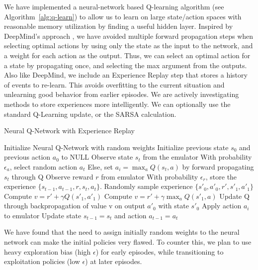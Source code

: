 \documentclass{article}
\begin{document}
We have implemented a neural-network based Q-learning algorithm (see Algorithm~\ref{alg:q-learn}) to allow us to learn on large state/action spaces with reasonable memory utilization by finding a useful hidden layer. Inspired by DeepMind's approach \cite{Mnih13}, we have avoided multiple forward propagation steps when selecting optimal actions by using only the state as the input to the network, and a weight for each action as the output. Thus, we can select an optimal action for a state by propagating once, and selecting the max argument from the outputs. Also like DeepMind, we include an Experience Replay step that stores a history of events to re-learn. This avoids overfitting to the current situation and unlearning good behavior from earlier episodes. We are actively investigating methods to store experiences more intelligently. We can optionally use the standard Q-Learning update, or the SARSA calculation.

\begin{algorithm}[tb]
   \caption{Neural Q-Network with Experience Replay}
   \label{alg:q-learn}
\begin{algorithmic}
   \STATE Initialize Neural Q-Network with random weights
   \STATE Initialize previous state $s_0$ and previous action $a_0$ to NULL
   \STATE Observe state $s_t$ from the emulator
   \STATE With probability $\epsilon_a$, select random action $a_t$
   \STATE Else, set $a_i = \max_a Q(s_t, a)$ by forward propagating $s_t$ through Q
   \STATE Observe reward $r$ from emulator
   \STATE With probability $\epsilon_r$, store the experience $\{s_{t-1}, a_{t-1}, r, s_t, a_t \}$.   
   \ENDIF
   \STATE Randomly sample experience $\{s'_0, a'_0, r', s'_1, a'_1 \}$
   \STATE Compute $v = r' + \gamma Q(s'_1, a'_1)$
   \ELSE
   \STATE Compute $v = r' + \gamma \max_a Q(s'_1, a)$
   \ENDIF
   \STATE Update Q through backpropagation of value v on output $a'_0$ with state $s'_0$
   \ENDFOR
   \STATE Apply action $a_i$ to emulator
   \STATE Update state $s_{t-1} = s_t$ and action $a_{t-1} = a_t$
   \ENDFOR
   \ENDFOR
\end{algorithmic}
\end{algorithm}

We have found that the need to assign initially random weights to the neural network can make the initial policies very flawed. To counter this, we plan to use heavy exploration bias (high $\epsilon$) for early episodes, while transitioning to exploitation policies (low $\epsilon$) at later episodes.
\end{document}
